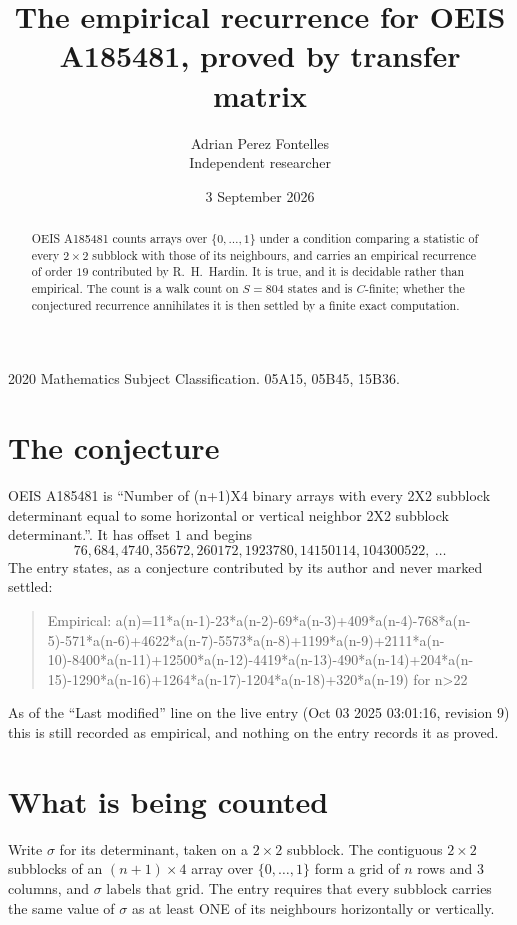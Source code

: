 \documentclass[11pt,a4paper]{article}
\title{The empirical recurrence for OEIS A185481, proved by transfer matrix}
\author{Adrian Perez Fontelles\\ \small Independent researcher}
\date{3 September 2026}
\theoremstyle{plain}
\theoremstyle{definition}
\begin{document}
\maketitle

\begin{abstract}
OEIS A185481 counts arrays over $\{0,\dots,1\}$ under a condition comparing a statistic of
every $2\times2$ subblock with those of its neighbours, and carries an empirical recurrence
of order $19$ contributed by R.~H.~Hardin. It is true, and it is decidable rather than
empirical. The count is a walk count on $S=804$ states and is $C$-finite; whether the
conjectured recurrence annihilates it is then settled by a finite exact computation.
\end{abstract}

\noindent\small 2020 Mathematics Subject Classification. 05A15, 05B45, 15B36.\normalsize

\section{The conjecture}

OEIS A185481 is ``Number of (n+1)X4 binary arrays with every 2X2 subblock determinant equal to some horizontal or vertical neighbor 2X2 subblock determinant.''. It has offset $1$ and begins
\[
76, 684, 4740, 35672, 260172, 1923780, 14150114, 104300522,\ \dots
\]
The entry states, as a conjecture contributed by its author and never marked settled:
\begin{quote}
Empirical: a(n)=11*a(n-1)-23*a(n-2)-69*a(n-3)+409*a(n-4)-768*a(n-5)-571*a(n-6)+4622*a(n-7)-5573*a(n-8)+1199*a(n-9)+2111*a(n-10)-8400*a(n-11)+12500*a(n-12)-4419*a(n-13)-490*a(n-14)+204*a(n-15)-1290*a(n-16)+1264*a(n-17)-1204*a(n-18)+320*a(n-19) for n>22
\end{quote}
As of the ``Last modified'' line on the live entry (Oct 03 2025 03:01:16, revision 9) this is still
recorded as empirical, and nothing on the entry records it as proved.

\section{What is being counted}

Write $\sigma$ for its determinant, taken on a $2\times2$ subblock. The contiguous $2\times2$
subblocks of an $(n+1)\times4$ array over $\{0,\dots,1\}$ form a grid of $n$ rows
and $3$ columns, and $\sigma$ labels that grid. The entry
requires that every subblock carries the same value of $\sigma$ as at least ONE of its neighbours horizontally or vertically.
\end{document}
